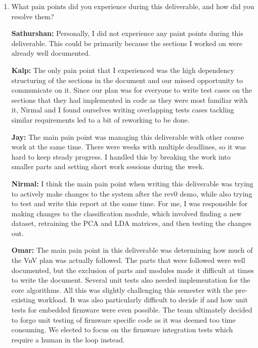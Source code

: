 \documentclass[12pt, titlepage]{article}
\begin{document}
{\begin{enumerate}
  \textbf{Nirmal:} Since I was responsible for writing the changes due to
  testing section of the report, I think it was clear what we needed to include
  in that due to transparency and good feedback received during our rev0 demo.
  Moreover, constant communication within the team helped facilitate this
  section as well, since we were all aware of changes that were already being
  made. 
  
  \item What pain points did you experience during this deliverable, and how did
    you resolve them?
  
  \textbf{Sathurshan:} Personally, I did not experience any paint points during
  this deliverable. This could be primarily because the sections I worked on
  were already well documented.

  \textbf{Kalp:} The only pain point that I experienced was the high dependency
  structuring of the sections in the document and our missed opportunity to
  communicate on it. Since our plan was for everyone to write test cases on the
  sections that they had implemented in code as they were most familiar with it,
  Nirmal and I found ourselves writing overlapping tests cases tackling similar
  requirements led to a bit of reworking to be done.
  
  \textbf{Jay:} The main pain point was managing this deliverable with other
  course work at the same time. There were weeks with multiple deadlines, so it
  was hard to keep steady progress. I handled this by breaking the work into
  smaller parts and setting short work sessions during the week.

  \textbf{Nirmal:} I think the main pain point when writing this deliverable was
  trying to actively make changes to the system after the rev0 demo, while also
  trying to test and write this report at the same time. For me, I was
  responsible for making changes to the classification module, which involved
  finding a new dataset, retraining the PCA and LDA matrices, and then testing
  the changes out. 

  \textbf{Omar:} The main pain point in this deliverable was determining how
  much of the VnV plan was actually followed. The parts that were followed were
  well documented, but the exclusion of parts and modules made it difficult at
  times to write the document. Several unit tests also needed implementation for
  the core algorithms. All this was slightly challenging this semester with the
  pre-existing workload. It was also particularly difficult to decide if and how
  unit tests for embedded firmware were even possible. The team ultimately
  decided to forgo unit testing of firmware specific code as it was deemed too
  time consuming. We elected to focus on the firmware integration tests which
  require a human in the loop instead.


\end{enumerate}}
\end{document}
